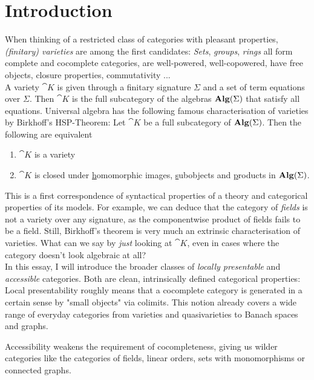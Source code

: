\section*{Introduction}
{}

When thinking of a restricted class of categories with pleasant properties, \emph{(finitary) varieties} are among the first candidates: \emph{Sets}, \emph{groups}, \emph{rings} all form complete and cocomplete categories, are well-powered, well-copowered, have free objects, closure properties, commutativity ... \\

A variety $\cat K$ is given through a finitary signature $\Sigma$ and a set of term equations over $\Sigma$. Then $\cat K$ is the full subcategory of the algebras $\mathbf{Alg}(\Sigma)$ that satisfy all equations. Universal algebra has the following famous characterisation of varieties by Birkhoff's HSP-Theorem: Let $\cat K$ be a full subcategory of $\mathbf{Alg}(\Sigma)$. Then the following are equivalent
\begin{enumerate}
\item $\cat K$ is a variety
\item $\cat K$ is closed under \underline{h}omomorphic images, \underline{s}ubobjects and \underline{p}roducts in $\mathbf{Alg}(\Sigma)$.
\end{enumerate}
This is a first correspondence of syntactical properties of a theory and categorical properties of its models. For example, we can deduce that the category of \emph{fields} is not a variety over any signature, as the componentwise product of fields fails to be a field. Still, Birkhoff's theorem is very much an extrinsic characterisation of varieties. What can we say by \emph{just} looking at $\cat K$, even in cases where the category doesn't look algebraic at all? \\

In this essay, I will introduce the broader classes of \emph{locally presentable} and \emph{accessible} categories. Both are clean, intrinsically defined categorical properties: Local presentability roughly means that a cocomplete category is generated in a certain sense by "small objects" via colimits. This notion already covers a wide range of everyday categories from varieties and quasivarieties to Banach spaces and graphs. 

Accessibility weakens the requirement of cocompleteness, giving us wilder categories like the categories of fields, linear orders, sets with monomorphisms or connected graphs. \\

